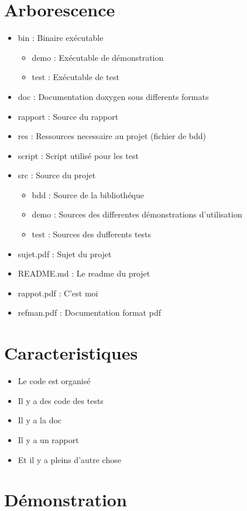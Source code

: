 \documentclass[a4paper]{article}
\begin{document}
\section{Arborescence}

\begin{itemize}
\item bin : Binaire exécutable
\begin{itemize}
  \item demo : Exécutable de démonstration
  \item test : Exécutable de test
\end{itemize}
\item doc : Documentation doxygen sous differents formats
\item rapport : Source du rapport
\item res : Ressources necessaire au projet (fichier de bdd)
\item script  : Script utilisé pour les test
\item src : Source du projet
\begin{itemize}
  \item bdd   : Source de la bibliothéque
  \item demo  : Sources des differentes démonstrations d'utilisation
  \item test  : Sources des dufferents tests
\end{itemize}

\item sujet.pdf  : Sujet du projet
\item README.md  : Le readme du projet 
\item rappot.pdf : C'est moi
\item refman.pdf : Documentation format pdf
\end{itemize}

\section{Caracteristiques}

\begin{itemize}
	\item Le code est organisé
	\item Il y a des code des tests
	\item Il y a la doc
	\item Il y a un rapport
	\item Et il y a pleins d'autre chose
\end{itemize}

\section{Démonstration}
\end{document}

